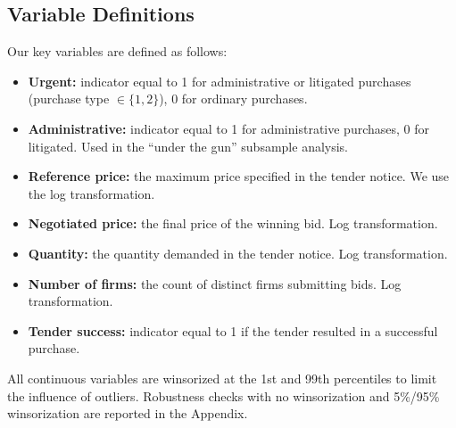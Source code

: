 \subsection{Variable Definitions}

Our key variables are defined as follows:
\begin{itemize}
  \item \textbf{Urgent:} indicator equal to 1 for administrative or litigated purchases (purchase type $\in \{1,2\}$), 0 for ordinary purchases.
  \item \textbf{Administrative:} indicator equal to 1 for administrative purchases, 0 for litigated. Used in the ``under the gun'' subsample analysis.
  \item \textbf{Reference price:} the maximum price specified in the tender notice. We use the log transformation.
  \item \textbf{Negotiated price:} the final price of the winning bid. Log transformation.
  \item \textbf{Quantity:} the quantity demanded in the tender notice. Log transformation.
  \item \textbf{Number of firms:} the count of distinct firms submitting bids. Log transformation.
  \item \textbf{Tender success:} indicator equal to 1 if the tender resulted in a successful purchase.
\end{itemize}

All continuous variables are winsorized at the 1st and 99th percentiles to limit the influence of outliers. Robustness checks with no winsorization and 5\%/95\% winsorization are reported in the Appendix.

